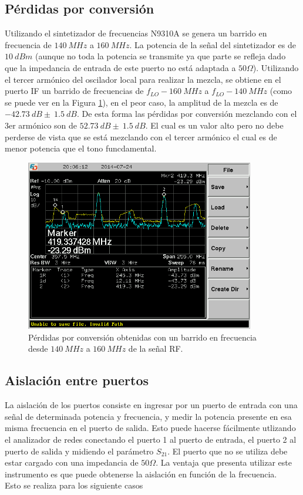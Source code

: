 \documentclass[a4paper,10pt]{article}
\begin{document}
	\subsection{P\'erdidas por conversi\'on}
	\indent Utilizando el sintetizador de frecuencias N9310A se genera un 
	barrido en frecuencia de $140~MHz$ a $160~MHz$. La potencia de la se\~nal 
	del sintetizador es de $10~dBm$ (aunque no toda la potencia se transmite ya 
	que parte se refleja dado que la impedancia de entrada de este puerto no 
	est\'a adaptada a $50\Omega$). Utilizando el tercer arm\'onico del oscilador
	local para realizar la mezcla, se obtiene en el puerto IF un barrido de 
	frecuencias de $f_{LO}-160~MHz$ a $f_{LO}-140~MHz$ (como se puede ver en la 
	Figura \ref{perdidas}), en el peor caso, la amplitud de la mezcla es de 
	$-42.73~dB\pm~1.5~dB$. De esta forma las p\'erdidas por conversi\'on 
	mezclando con el 3er arm\'onico son de $52.73~dB\pm~1.5~dB$. El cual es un valor alto pero no debe perderse de vista que se est\'a mezclando con el tercer arm\'onico el cual es de menor potencia que el tono funcdamental.
	
	\begin{figure}[!htb]
		\centering
		\includegraphics[width=10cm]{Images/SCREN538.png}
		\caption{P\'erdidas por conversi\'on obtenidas con un barrido en 
		frecuencia desde $140~MHz$ a $160~MHz$ de la se\~nal RF.}
		\label{perdidas}
	\end{figure}	
	
	\subsection{Aislación entre puertos}
	\indent La aislaci\'on de los puertos consiste en ingresar por un puerto de 
	entrada con una se\~nal de determinada potencia y frecuencia, y medir la 
	potencia presente en esa misma frecuencia en el puerto de salida. Esto puede
	hacerse f\'acilmente utlizando el analizador de redes conectando el puerto 1 
	al puerto de entrada, el puerto 2 al puerto de salida y midiendo el 
	par\'ametro $S_{21}$. El puerto que no se utiliza debe estar cargado con una
	impedancia de $50\Omega$. La ventaja que presenta utilizar este instrumento 
	es que puede obtenerse la aislaci\'on en funci\'on de la frecuencia. \\
	\indent Esto se realiza para los siguiente casos
	
\end{document}
